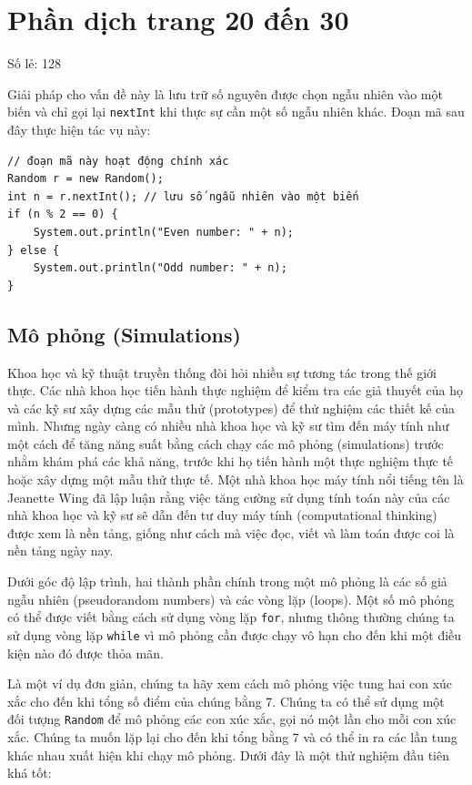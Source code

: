 \section{Phần dịch trang 20 đến 30}
Số lẻ: 128

Giải pháp cho vấn đề này là lưu trữ số nguyên được chọn ngẫu nhiên vào một biến và chỉ gọi lại \texttt{nextInt} khi thực sự cần một số ngẫu nhiên khác. Đoạn mã sau đây thực hiện tác vụ này:

\begin{verbatim}
// đoạn mã này hoạt động chính xác
Random r = new Random();
int n = r.nextInt(); // lưu số ngẫu nhiên vào một biến
if (n % 2 == 0) {
    System.out.println("Even number: " + n);
} else {
    System.out.println("Odd number: " + n);
}
\end{verbatim}

\subsection*{Mô phỏng (Simulations)}

Khoa học và kỹ thuật truyền thống đòi hỏi nhiều sự tương tác trong thế giới thực. Các nhà khoa học tiến hành thực nghiệm để kiểm tra các giả thuyết của họ và các kỹ sư xây dựng các mẫu thử (prototypes) để thử nghiệm các thiết kế của mình. Nhưng ngày càng có nhiều nhà khoa học và kỹ sư tìm đến máy tính như một cách để tăng năng suất bằng cách chạy các mô phỏng (simulations) trước nhằm khám phá các khả năng, trước khi họ tiến hành một thực nghiệm thực tế hoặc xây dựng một mẫu thử thực tế. Một nhà khoa học máy tính nổi tiếng tên là Jeanette Wing đã lập luận rằng việc tăng cường sử dụng tính toán này của các nhà khoa học và kỹ sư sẽ dẫn đến tư duy máy tính (computational thinking) được xem là nền tảng, giống như cách mà việc đọc, viết và làm toán được coi là nền tảng ngày nay.

Dưới góc độ lập trình, hai thành phần chính trong một mô phỏng là các số giả ngẫu nhiên (pseudorandom numbers) và các vòng lặp (loops). Một số mô phỏng có thể được viết bằng cách sử dụng vòng lặp \texttt{for}, nhưng thông thường chúng ta sử dụng vòng lặp \texttt{while} vì mô phỏng cần được chạy vô hạn cho đến khi một điều kiện nào đó được thỏa mãn.

Là một ví dụ đơn giản, chúng ta hãy xem cách mô phỏng việc tung hai con xúc xắc cho đến khi tổng số điểm của chúng bằng 7. Chúng ta có thể sử dụng một đối tượng \texttt{Random} để mô phỏng các con xúc xắc, gọi nó một lần cho mỗi con xúc xắc. Chúng ta muốn lặp lại cho đến khi tổng bằng 7 và có thể in ra các lần tung khác nhau xuất hiện khi chạy mô phỏng. Dưới đây là một thử nghiệm đầu tiên khá tốt:

